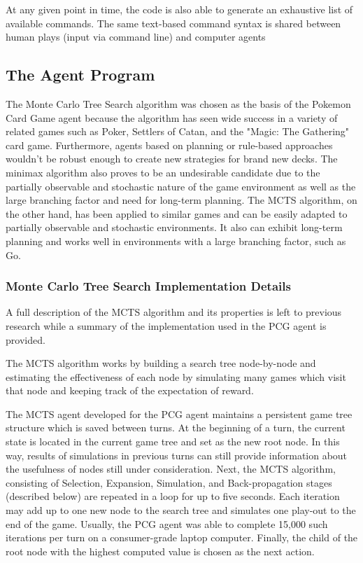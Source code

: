 \documentclass{article}
\begin{document}
At any given point in time, the code is also able to generate an exhaustive list of available commands.  The same text-based command syntax is shared between human plays (input via command line) and computer agents

\subsection{The Agent Program} %
The Monte Carlo Tree Search algorithm was chosen as the basis of the Pokemon Card Game agent because the algorithm has seen wide success in a variety of related games such as Poker, Settlers of Catan, and the "Magic: The Gathering" card game. Furthermore, agents based on planning or rule-based approaches wouldn't be robust enough to create new strategies for brand new decks. The minimax algorithm also proves to be an undesirable candidate due to the partially observable and stochastic nature of the game environment as well as the large branching factor and need for long-term planning. The MCTS algorithm, on the other hand, has been applied to similar games and can be easily adapted to partially observable and stochastic environments. It also can exhibit long-term planning and works well in environments with a large branching factor, such as Go. 

\subsubsection{Monte Carlo Tree Search Implementation Details} %
A full description of the MCTS algorithm and its properties is left to previous research while a summary of the implementation used in the PCG agent is provided. 

The MCTS algorithm works by building a search tree node-by-node and estimating the effectiveness of each node by simulating many games which visit that node and keeping track of the expectation of reward. 

The MCTS agent developed for the PCG agent maintains a persistent game tree structure which is saved between turns. At the beginning of a turn, the current state is located in the current game tree and set as the new root node. In this way, results of simulations in previous turns can still provide information about the usefulness of nodes still under consideration. Next, the MCTS algorithm, consisting of Selection, Expansion, Simulation, and Back-propagation stages (described below) are repeated in a loop for up to five seconds. Each iteration may add up to one new node to the search tree and simulates one play-out to the end of the game. Usually, the PCG agent was able to complete 15,000 such iterations per turn on a consumer-grade laptop computer. Finally, the child of the root node with the highest computed value is chosen as the next action. 
\end{document}

